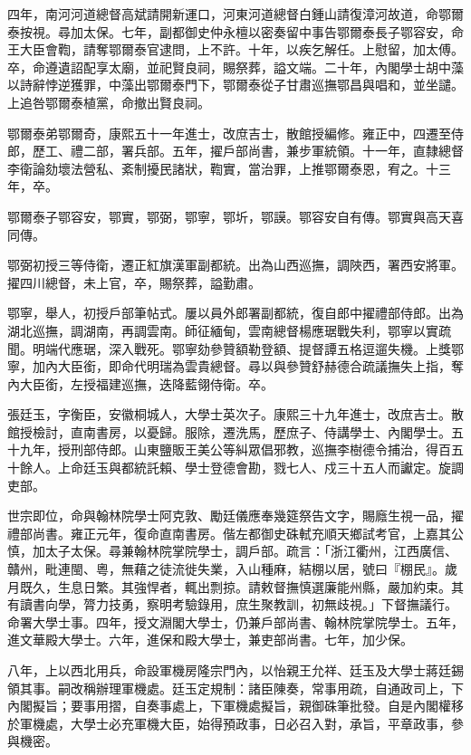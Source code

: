 \begin{pinyinscope}
四年，南河河道總督高斌請開新運口，河東河道總督白鍾山請復漳河故道，命鄂爾泰按視。尋加太保。七年，副都御史仲永檀以密奏留中事告鄂爾泰長子鄂容安，命王大臣會鞫，請奪鄂爾泰官逮問，上不許。十年，以疾乞解任。上慰留，加太傅。卒，命遵遺詔配享太廟，並祀賢良祠，賜祭葬，謚文端。二十年，內閣學士胡中藻以詩辭悖逆獲罪，中藻出鄂爾泰門下，鄂爾泰從子甘肅巡撫鄂昌與唱和，並坐譴。上追咎鄂爾泰植黨，命撤出賢良祠。

鄂爾泰弟鄂爾奇，康熙五十一年進士，改庶吉士，散館授編修。雍正中，四遷至侍郎，歷工、禮二部，署兵部。五年，擢戶部尚書，兼步軍統領。十一年，直隸總督李衛論劾壞法營私、紊制擾民諸狀，鞫實，當治罪，上推鄂爾泰恩，宥之。十三年，卒。

鄂爾泰子鄂容安，鄂實，鄂弼，鄂寧，鄂圻，鄂謨。鄂容安自有傳。鄂實與高天喜同傳。

鄂弼初授三等侍衛，遷正紅旗漢軍副都統。出為山西巡撫，調陜西，署西安將軍。擢四川總督，未上官，卒，賜祭葬，謚勤肅。

鄂寧，舉人，初授戶部筆帖式。屢以員外郎署副都統，復自郎中擢禮部侍郎。出為湖北巡撫，調湖南，再調雲南。師征緬甸，雲南總督楊應琚戰失利，鄂寧以實疏聞。明端代應琚，深入戰死。鄂寧劾參贊額勒登額、提督譚五格逗遛失機。上獎鄂寧，加內大臣銜，即命代明瑞為雲貴總督。尋以與參贊舒赫德合疏議撫失上指，奪內大臣銜，左授福建巡撫，迭降藍翎侍衛。卒。

張廷玉，字衡臣，安徽桐城人，大學士英次子。康熙三十九年進士，改庶吉士。散館授檢討，直南書房，以憂歸。服除，遷洗馬，歷庶子、侍講學士、內閣學士。五十九年，授刑部侍郎。山東鹽販王美公等糾眾倡邪教，巡撫李樹德令捕治，得百五十餘人。上命廷玉與都統託賴、學士登德會勘，戮七人、戍三十五人而讞定。旋調吏部。

世宗即位，命與翰林院學士阿克敦、勵廷儀應奉幾筵祭告文字，賜廕生視一品，擢禮部尚書。雍正元年，復命直南書房。偕左都御史硃軾充順天鄉試考官，上嘉其公慎，加太子太保。尋兼翰林院掌院學士，調戶部。疏言：「浙江衢州，江西廣信、贛州，毗連閩、粵，無藉之徒流徙失業，入山種麻，結棚以居，號曰『棚民』。歲月既久，生息日繁。其強悍者，輒出剽掠。請敕督撫慎選廉能州縣，嚴加約束。其有讀書向學，膂力技勇，察明考驗錄用，庶生聚教訓，初無歧視。」下督撫議行。命署大學士事。四年，授文淵閣大學士，仍兼戶部尚書、翰林院掌院學士。五年，進文華殿大學士。六年，進保和殿大學士，兼吏部尚書。七年，加少保。

八年，上以西北用兵，命設軍機房隆宗門內，以怡親王允祥、廷玉及大學士蔣廷錫領其事。嗣改稱辦理軍機處。廷玉定規制：諸臣陳奏，常事用疏，自通政司上，下內閣擬旨；要事用摺，自奏事處上，下軍機處擬旨，親御硃筆批發。自是內閣權移於軍機處，大學士必充軍機大臣，始得預政事，日必召入對，承旨，平章政事，參與機密。


\end{pinyinscope}
